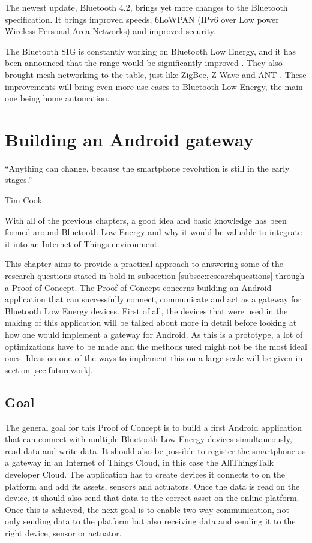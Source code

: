 \documentclass[pdftex,a4paper,12pt,twoside]{report}
\begin{document}
The newest update, Bluetooth 4.2, brings yet more changes to the Bluetooth specification. It brings improved speeds, 6LoWPAN (IPv6 over Low power Wireless Personal Area Networks) and improved security.

The Bluetooth SIG is constantly working on Bluetooth Low Energy, and it has been announced that the range would be significantly improved \citep{bluetooth2016roadmap}. They also brought mesh networking to the table, just like ZigBee, Z-Wave and ANT \citep{bluetooth2016roadmap}. These improvements will bring even more use cases to Bluetooth Low Energy, the main one being home automation.

\chapter{Building an Android gateway}
\label{ch:android}
\epigraph{``Anything can change, because the smartphone revolution is still in the early stages.''}{Tim Cook}
With all of the previous chapters, a good idea and basic knowledge has been formed around Bluetooth Low Energy and why it would be valuable to integrate it into an Internet of Things environment.

This chapter aims to provide a practical approach to answering some of the research questions stated in bold in subsection \ref{subsec:researchquestions} through a Proof of Concept. The Proof of Concept concerns building an Android application that can successfully connect, communicate and act as a gateway for Bluetooth Low Energy devices. First of all, the devices that were used in the making of this application will be talked about more in detail before looking at how one would implement a gateway for Android. As this is a prototype, a lot of optimizations have to be made and the methods used might not be the most ideal ones. Ideas on one of the ways to implement this on a large scale will be given in section \ref{sec:futurework}.

\section{Goal}
\label{sec:pocgoal}
The general goal for this Proof of Concept is to build a first Android application that can connect with multiple Bluetooth Low Energy devices simultaneously, read data and write data. It should also be possible to register the smartphone as a gateway in an Internet of Things Cloud, in this case the AllThingsTalk developer Cloud. The application has to create devices it connects to on the platform and add its assets, sensors and actuators. Once the data is read on the device, it should also send that data to the correct asset on the online platform. Once this is achieved, the next goal is to enable two-way communication, not only sending data to the platform but also receiving data and sending it to the right device, sensor or actuator.
\end{document}
